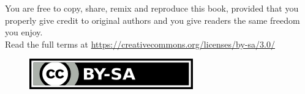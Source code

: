 \vfill
\noindent
You are free to copy, share, remix and reproduce this book, provided that you properly give credit to original authors and you give readers the same freedom you enjoy.\\
Read the full terms at \url{https://creativecommons.org/licenses/by-sa/3.0/}\\
\begin{figure}[!h]
	\centering
	\includegraphics{images/CC-BY-SA_iconSmall.png}
\end{figure}
